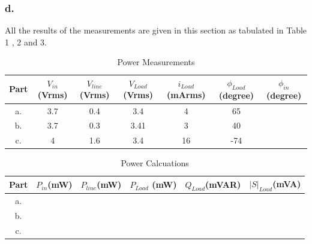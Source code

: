 \documentclass[letterpaper,12pt]{article}
\begin{document}
\subsubsection{d.}
All the results of the measurements are given in this section as tabulated in Table 1 , 2 and 3.
\begin{table}[H]
    \begin{center}
        \caption{Power Measurements}
        \vspace{2mm}
        \begin{tabular}{||c | c | c | c | c | c | c ||} 
            \hline
            Part & \(V_{in}\)\newline (Vrms) & \(V_{line}\)\newline (Vrms) & \(V_{Load}\) \newline (Vrms) &\(i_{Load}\)\newline (mArms) & \(\phi_{Load}\)\newline(degree) &\(\phi_{in}\)\newline(degree)  \\ [0.5ex] 
            \hline\hline
            a. & 3.7 & 0.4   & 3.4 & 4& 65 &   \\ 
            \hline
            b. &3.7 &0.3  &3.41 &  3 & 40&    \\
            \hline
            c. &4 &1.6  &3.4 &16 &-74 &   \\ [1ex] 
            \hline
        \end{tabular}
\end{center}
\end{table}


\begin{table}[H]
    \begin{center}
        \caption{Power Calcuations}
        \vspace{2mm}
        \begin{tabular}{||c | c | c | c | c | c ||} 
            \hline
            Part & \(P_{in}\)\newline (mW) & \(P_{line}\)\newline (mW) & \(P_{Load}\) \newline (mW) &\(Q_{Load}\)\newline (mVAR) & \(|S|_{Load}\)\newline(mVA)   \\ [0.5ex] 
            \hline\hline
            a. & &  & & &    \\ 
            \hline
            b. & &  & & &     \\
            \hline
            c. & &  & & &    \\ [1ex] 
            \hline
        \end{tabular}
\end{center}
\end{table}
\end{document}
